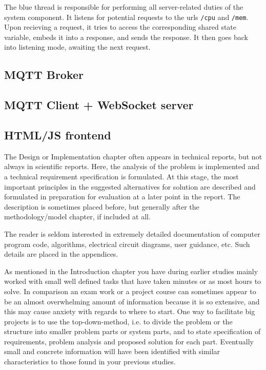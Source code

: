 The blue thread is responsible for performing all server-related duties of the system component. It listens for potential requests to the urls \lstinline{/cpu} and \lstinline{/mem}. Upon recieving a request, it tries to access the corresponding shared state variable, embeds it into a response, and sends the response. It then goes back into listening mode, awaiting the next request.

\subsection{MQTT Broker}

\subsection{MQTT Client + WebSocket server}

\subsection{HTML/JS frontend}

\iffalse
The Design or Implementation chapter often appears in technical reports, but not always in scientific reports. Here, the analysis of the problem is implemented and a technical requirement specification is formulated. At this stage, the most important principles in the suggested alternatives for solution are described and formulated in preparation for evaluation at a later point in the report. The description is sometimes placed before, but generally after the methodology/model chapter, if included at all.

The reader is seldom interested in extremely detailed documentation of computer program code, algorithms, electrical circuit diagrams, user guidance, etc. Such details are placed in the appendices.

As mentioned in the Introduction chapter you have during earlier studies mainly worked with small well defined tasks that have taken minutes or as most hours to solve. In comparison an exam work or a project course can sometimes appear to be an almost overwhelming amount of information because it is so extensive, and this may cause anxiety with regards to where to start. One way to facilitate big projects is to use the top-down-method, i.e. to divide the problem or the structure into smaller problem parts or system parts, and to state specification of  requirements, problem analysis and proposed solution for each part. Eventually small and concrete information will have been identified with similar characteristics to those found in your previous studies.

